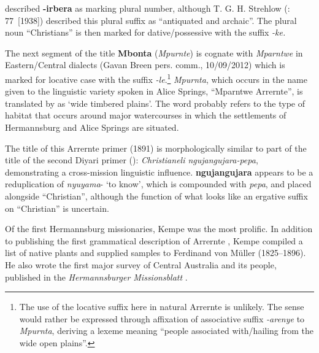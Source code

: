 \citet[4]{kempe_grammar_1891} described \textbf{{}-irbera} as marking plural number, although T. G. H. Strehlow (\citeyear{strehlow_aranda_1944}: 77~[1938]) described this plural suffix as “antiquated and archaic”. The plural noun “Christians” is then marked for dative/possessive with the suffix \textit{-ke.}

The next segment of the title \textbf{Mbonta} (\textit{Mpurnte}) is cognate with \textit{Mparntwe} in Eastern/Central dialects (Gavan Breen pers. comm., 10/09/2012) which is marked for locative case with the suffix \textit{-le}.\footnote{The use of the locative suffix here in natural Arrernte is unlikely. The sense would rather be expressed through affixation of associative suffix \textit{-arenye} \citep[202]{wilkins_mparntwe_1989} to \textit{Mpurnta}, deriving a lexeme meaning “people associated with/hailing from the wide open plains''.}  \textit{Mpurnta}, which occurs in the name given to the linguistic variety spoken in Alice Springs, “Mparntwe Arrernte”, is translated by \citet[42]{strehlow_no_1979} as `wide timbered plains'. The word probably refers to the type of habitat that occurs around major watercourses in which the settlements of Hermannsburg and Alice Springs are situated.

The title of this Arrernte primer (1891) is morphologically similar to part of the title of the second Diyari primer (\citealt{flierl_christianieli_1880}): \textit{Christianeli ngujangujara-pepa}, demonstrating a cross-mission linguistic influence. \textbf{ngujangujara} appears to be a reduplication of \textit{nyuyama}{}- `to know', which is compounded with \textit{pepa}, and placed alongside ``Christian'', although the function of what looks like an ergative suffix on “Christian” is uncertain.

Of the first Hermannsburg missionaries, Kempe was the most prolific. In addition to publishing the first grammatical description of Arrernte \citeyearpar{kempe_grammar_1891}, Kempe compiled a list of native plants and supplied samples to Ferdinand von Müller (1825--1896). He also wrote the first major survey of Central Australia and its people, published in the \textit{Hermannsburger Missionsblatt} \citep{kempe_report_1881}.

